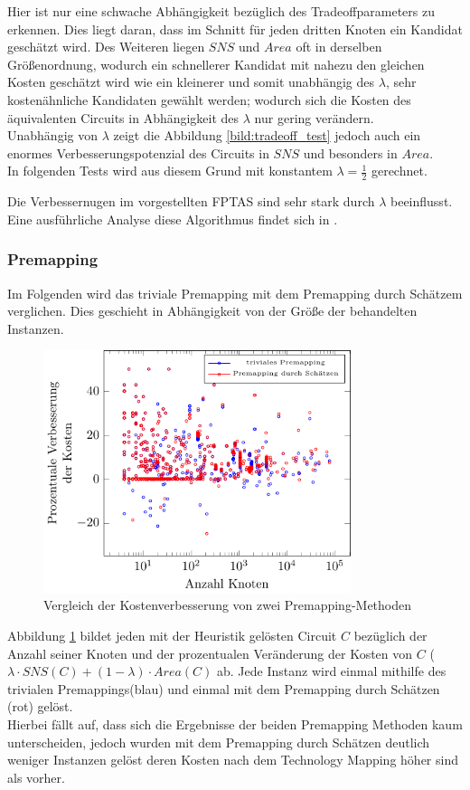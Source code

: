 \documentclass[11pt, a4paper, german]{article}
\newcommand{\TM}{Technology  Mapping }
\begin{document}
Hier ist nur eine schwache Abh\"angigkeit bez\"uglich des Tradeoffparameters zu erkennen. Dies liegt daran, dass im Schnitt f\"ur jeden dritten Knoten ein Kandidat gesch\"atzt wird. Des Weiteren liegen $SNS$ und $Area$ oft in derselben Gr\"o\ss enordnung, wodurch ein schnellerer Kandidat mit nahezu den gleichen Kosten gesch\"atzt wird wie ein kleinerer und somit unabhängig des $\lambda$, sehr kosten\"ahnliche Kandidaten gew\"ahlt werden; wodurch sich die Kosten des \"aquivalenten Circuits in Abh\"angigkeit des $\lambda$ nur gering ver\"andern.\\
Unabh\"angig von $\lambda$ zeigt die Abbildung \ref{bild:tradeoff_test} jedoch auch ein enormes Verbesserungspotenzial des Circuits in $SNS$ und besonders in $Area$.\\
In folgenden Tests wird aus diesem Grund mit konstantem $\lambda = \frac{1}{2}$ gerechnet.

Die Verbessernugen im vorgestellten FPTAS sind sehr stark durch $\lambda$ beeinflusst. Eine ausf\"uhrliche Analyse diese Algorithmus findet sich in \cite{Elbert}.


\subsubsection{Premapping}
Im Folgenden wird das triviale Premapping mit dem Premapping durch Sch\"atzem verglichen. Dies geschieht in Abh\"angigkeit von der Gr\"o{\ss}e der behandelten Instanzen. \\
\begin{figure}[h]
		\centering
		\includegraphics[width = 9cm]{pictures/tex_files/analysis/prem_test}
		\caption{Vergleich der Kostenverbesserung von zwei Premapping-Methoden}
		\label{bild:prem_test}
\end{figure}

Abbildung \ref{bild:prem_test} bildet jeden mit der Heuristik gel\"osten Circuit $C$ bez\"uglich der Anzahl seiner Knoten und der prozentualen Ver\"anderung der Kosten von $C$ ($\lambda \cdot SNS(C) + (1-\lambda) \cdot Area(C)$ ab. Jede Instanz wird einmal mithilfe des trivialen Premappings(blau) und einmal mit dem Premapping durch Sch\"atzen (rot) gel\"ost.\\
Hierbei f\"allt auf, dass sich die Ergebnisse der beiden Premapping Methoden kaum unterscheiden, jedoch wurden mit dem Premapping durch Sch\"atzen deutlich weniger Instanzen gel\"ost deren Kosten nach dem \TM h\"oher sind als vorher. \\
\end{document}
